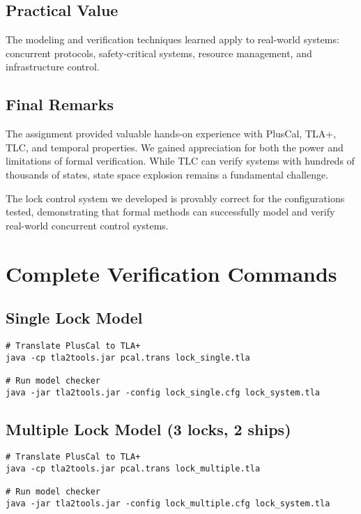 \documentclass[12pt,a4paper]{article}
\begin{document}
\subsection{Practical Value}

The modeling and verification techniques learned apply to real-world systems: concurrent protocols, safety-critical systems, resource management, and infrastructure control.

\subsection{Final Remarks}

The assignment provided valuable hands-on experience with PlusCal, TLA+, TLC, and temporal properties. We gained appreciation for both the power and limitations of formal verification. While TLC can verify systems with hundreds of thousands of states, state space explosion remains a fundamental challenge.

The lock control system we developed is provably correct for the configurations tested, demonstrating that formal methods can successfully model and verify real-world concurrent control systems.

\newpage
\appendix

\section{Complete Verification Commands}

\subsection{Single Lock Model}
\begin{verbatim}
# Translate PlusCal to TLA+
java -cp tla2tools.jar pcal.trans lock_single.tla

# Run model checker
java -jar tla2tools.jar -config lock_single.cfg lock_system.tla
\end{verbatim}

\subsection{Multiple Lock Model (3 locks, 2 ships)}
\begin{verbatim}
# Translate PlusCal to TLA+
java -cp tla2tools.jar pcal.trans lock_multiple.tla

# Run model checker
java -jar tla2tools.jar -config lock_multiple.cfg lock_system.tla
\end{verbatim}
\end{document}
